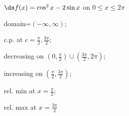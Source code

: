 {$\ds f(x) =\cos^2 x-2 \sin x$ on $0\le x\le2\pi$
}
{domain=$(-\infty,\infty)$;

c.p. at $c=\frac\pi2,\frac{3\pi}2$;

decreasing on $(0,\frac\pi2)\cup(\frac{3\pi}2,2\pi)$;

increasing on $(\frac\pi2,\frac{3\pi}2)$;

rel. min at $x=\frac\pi2$;

rel. max at $x=\frac{3\pi}2$
}
